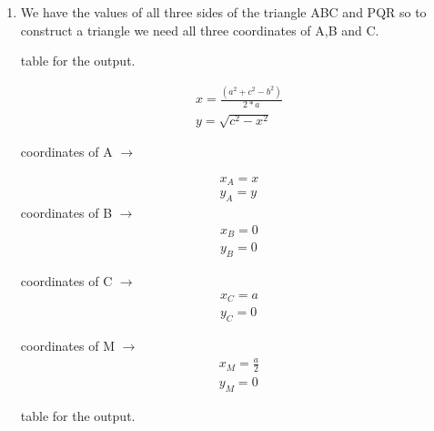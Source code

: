 \renewcommand{\thefigure}{\arabic{section}.\arabic{subsection}.\arabic{figure}}

\renewcommand{\thetable}{\arabic{section}.\arabic{subsection}.\arabic{table}}
\def\inputGnumericTable{} 
\begin{enumerate}
		\item
		We have the values of all three sides of the triangle ABC and PQR so to construct  a triangle we need all three coordinates of A,B and C.
		
	\begin{table}[h!]
		\begin{center}
			\caption{table for the output.}
			\label{tab:table1}
			
		\end{center}
	\end{table}
		
		\begin{align}
		x = \frac{\left(a^2 + c^2 - b^2\right)}{2*a}
		\\
		y=\sqrt{c^2 - x^2}
		\end{align}
		
		coordinates of A $\to$
		
		\begin{align}
		x_A = x       		
		\\
		y_A = y
		\end{align}	
		coordinates of B $\to$
		\begin{align}
		x_B = 0       		
		\\
		y_B = 0
		\end{align}
		
		coordinates of C $\to$
		\begin{align}
		x_C = a      		
		\\
		y_C = 0
		\end{align}
		
		coordinates of M $\to$
		\begin{align}
		x_M = \frac{a}{2}       		
		\\
		y_M = 0
		\end{align}
		
		
			\begin{table}[h!]
				\begin{center}
					\caption{table for the output.}
					\label{tab:table1}
								
				\end{center}
			\end{table}
	

\end{enumerate}
